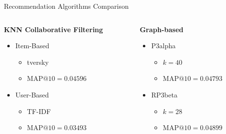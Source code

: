 \documentclass{beamer}
\begin{document}
\begin{frame}{Recommendation Algorithms Comparison}
  \begin{columns}[t]
    \begin{column}{0.5\textwidth}
      \textbf{KNN Collaborative Filtering}
      \begin{itemize}
        \item Item-Based
        \begin{itemize}
          \item tversky
          \item $\text{MAP@}10=0.04596$
        \end{itemize}
        \item User-Based
        \begin{itemize}
          \item TF-IDF
          \item $\text{MAP@}10=0.03493$
        \end{itemize}
      \end{itemize}
    \end{column}
    
    \begin{column}{0.5\textwidth}
      \textbf{Graph-based}
      \begin{itemize}
        \item P3alpha
        \begin{itemize}
            \item $k=40$
            \item $\text{MAP@}10=0.04793$
        \end{itemize}
        \item RP3beta
        \begin{itemize}
          \item $k=28$
          \item $\text{MAP@}10=0.04899$
        \end{itemize}
      \end{itemize}
    \end{column}
  \end{columns}
\end{frame}
\end{document}
